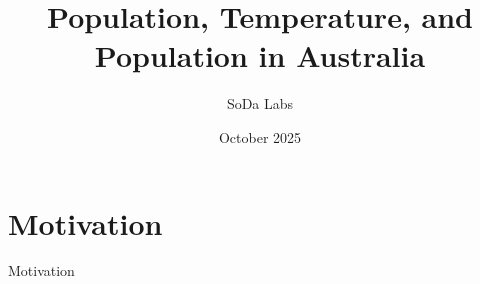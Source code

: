 \documentclass[aspectratio=169]{beamer}
\title{Population, Temperature, and Population in Australia}
\author{SoDa Labs}
\institute{Monash University}
\date{October 2025}
\begin{document}
\begin{frame}[plain]
  \titlepage
\end{frame}
\addtocounter{framenumber}{-1}

\section{Motivation}
\begin{frame}{Motivation}
\end{frame}
\end{document}
